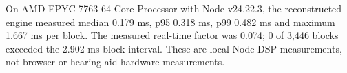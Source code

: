 On AMD EPYC 7763 64-Core Processor with Node v24.22.3, the reconstructed engine measured median 0.179 ms, p95 0.318 ms, p99 0.482 ms and maximum 1.667 ms per block. The measured real-time factor was 0.074; 0 of 3,446 blocks exceeded the 2.902 ms block interval. These are local Node DSP measurements, not browser or hearing-aid hardware measurements.

